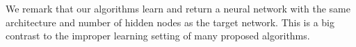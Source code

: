 We remark that our algorithms learn and return a neural network with the same architecture and number of hidden nodes as the target network. This is a big contrast to the improper learning setting of many proposed algorithms. 



%

